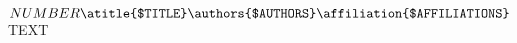 $NUMBER

\atitle{$TITLE}

\bigskip

\bigskip

\bigskip

\authors{$AUTHORS}

\affiliation{$AFFILIATIONS}

\bigskip

\bigskip

\bigskip

\bigskip
\noindent $TEXT
